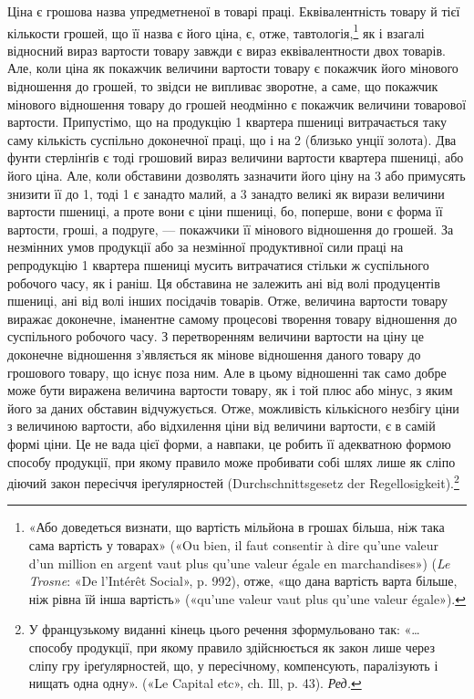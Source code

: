 Ціна є грошова назва упредметненої в товарі праці. Еквівалентність
товару й тієї кількости грошей, що її назва є його ціна, є,
отже, тавтологія,\footnote{
«Або доведеться визнати, що вартість мільйона в грошах більша,
ніж така сама вартість у товарах» («Ou bien, il faut consentir à dire qu’une
valeur d’un million en argent vaut plus qu’une valeur égale en marchandises»)
(\emph{Le Trosne}: «De l’Intérêt Social», p. 992), отже, «що дана вартість варта
більше, ніж рівна їй інша вартість» («qu’une valeur vaut plus qu’une valeur
égale»).
} як і взагалі відносний вираз вартости товару
завжди є вираз еквівалентности двох товарів. Але, коли ціна
як покажчик величини вартости товару є покажчик його мінового
відношення до грошей, то звідси не випливає зворотне,
а саме, що покажчик мінового відношення товару до грошей
неодмінно є покажчик величини товарової вартости. Припустімо,
що на продукцію 1 квартера пшениці витрачається таку саму
кількість суспільно доконечної праці, що і на 2
(близько  унції золота). Два фунти стерлінґів є тоді грошовий
вираз величини вартости квартера пшениці, або його ціна.
Але, коли обставини дозволять зазначити його ціну на 3 або примусять знизити її до 1, тоді
1 є занадто малий, а 3 занадто
великі як вирази величини вартости пшениці, а проте вони є
ціни пшениці, бо, поперше, вони є форма її вартости, гроші, а
подруге, — покажчики її мінового відношення до грошей. За
незмінних умов продукції або за незмінної продуктивної сили
праці на репродукцію 1 квартера пшениці мусить витрачатися
стільки ж суспільного робочого часу, як і раніш. Ця обставина
не залежить ані від волі продуцентів пшениці, ані від волі інших
посідачів товарів. Отже, величина вартости товару виражає доконечне,
іманентне самому процесові творення товару відношення
до суспільного робочого часу. З перетворенням величини вартости
на ціну це доконечне відношення з’являється як мінове
відношення даного товару до грошового товару, що існує поза
ним. Але в цьому відношенні так само добре може бути виражена
величина вартости товару, як і той плюс або мінус, з яким його
за даних обставин відчужується. Отже, можливість кількісного
незбігу ціни з величиною вартости, або відхилення ціни від величини
вартости, є в самій формі ціни. Це не вада цієї форми, а
навпаки, це робить її адекватною формою способу продукції,
при якому правило може пробивати собі шлях лише як сліпо
діючий закон пересіччя іреґулярностей (Durchschnittsgesetz der
Regellosigkeit).\footnote*{
У французькому виданні кінець цього речення зформульовано
так: «\dots{} способу продукції, при якому правило здійснюється як закон
лише через сліпу гру іреґулярностей, що, у пересічному, компенсують,
паралізують і нищать одна одну». («Le Capital etc», ch. Ill, p. 43). \emph{Ред.}
}

